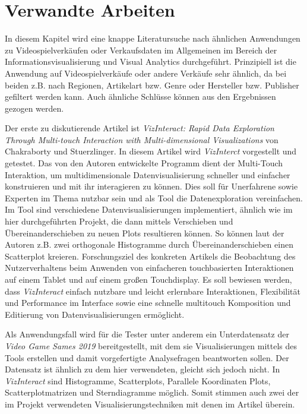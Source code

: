 \documentclass[usegeometry=true]{scrartcl}
\begin{document}
\section{Verwandte Arbeiten}
In diesem Kapitel wird eine knappe Literatursuche nach ähnlichen Anwendungen zu Videospielverkäufen oder Verkaufsdaten im Allgemeinen im Bereich der Informationsvisualisierung und Visual Analytics durchgeführt. 
Prinzipiell ist die Anwendung auf Videospielverkäufe oder andere Verkäufe sehr ähnlich, da bei beiden z.B. nach Regionen, Artikelart bzw. Genre oder Hersteller bzw. Publisher gefiltert werden kann. 
Auch ähnliche Schlüsse können aus den Ergebnissen gezogen werden.

Der erste zu diskutierende Artikel ist \textit{VizInteract: Rapid Data Exploration Through Multi-touch Interaction with Multi-dimensional Visualizations} von Chakraborty und Stuerzlinger.\cite{Chakraborty.2021}
In diesem Artikel wird \textit{VizInterct} vorgestellt und getestet. 
Das von den Autoren entwickelte Programm dient der Multi-Touch Interaktion, um multidimensionale Datenvisualisierung schneller und einfacher konstruieren und mit ihr interagieren zu können.
Dies soll für Unerfahrene sowie Experten im Thema nutzbar sein und als Tool die Datenexploration vereinfachen.
Im Tool sind verschiedene Datenvisualisierungen implementiert, ähnlich wie im hier durchgeführten Projekt, die dann mittels Verschieben und Übereinanderschieben zu neuen Plots resultieren können. 
So können laut der Autoren z.B. zwei orthogonale Histogramme durch Übereinanderschieben einen Scatterplot kreieren. 
Forschungsziel des konkreten Artikels die Beobachtung des Nutzerverhaltens beim Anwenden von einfacheren touchbasierten Interaktionen auf einem Tablet und auf einem großen Touchdisplay.
Es soll bewiesen werden, dass \textit{VizInteract} einfach nutzbare und leicht erlernbare Interaktionen, Flexibilität und Performance im Interface sowie eine schnelle multitouch Komposition und Editierung von Datenvisualisierungen ermöglicht.

Als Anwendungsfall wird für die Tester unter anderem ein Unterdatensatz der \textit{Video Game Sames 2019} bereitgestellt, mit dem sie Visualisierungen mittels des Tools erstellen und damit vorgefertigte Analysefragen beantworten sollen.
Der Datensatz ist ähnlich zu dem hier verwendeten, gleicht sich jedoch nicht. 
In \textit{VizInteract} sind Histogramme, Scatterplots, Parallele Koordinaten Plots, Scatterplotmatrizen und Sterndiagramme möglich. 
Somit stimmen auch zwei der im Projekt verwendeten Visualisierungstechniken mit denen im Artikel überein. 
\end{document}
